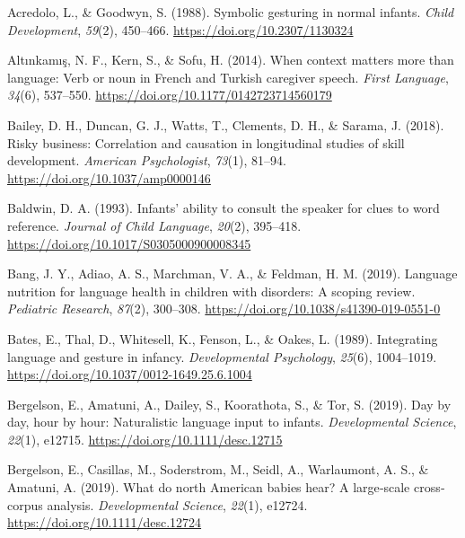 \documentclass[
  man,mask,floatsintext]{apa6}
\newlength{\cslhangindent}
\newlength{\cslentryspacingunit} %
\newenvironment{CSLReferences}[2] %
 {%
  \setlength{\parindent}{0pt}
  \ifodd #1
  \let\oldpar\par
  \def\par{\hangindent=\cslhangindent\oldpar}
  \fi
  \setlength{\parskip}{#2\cslentryspacingunit}
 }%
 {}
\begin{document}
\hypertarget{refs}{}
\begin{CSLReferences}{1}{0}
\leavevmode{}%
Acredolo, L., \& Goodwyn, S. (1988). Symbolic gesturing in normal infants. \emph{Child Development}, \emph{59}(2), 450--466. \url{https://doi.org/10.2307/1130324}

\leavevmode{}%
Altınkamış, N. F., Kern, S., \& Sofu, H. (2014). When context matters more than language: {Verb} or noun in {French} and {Turkish} caregiver speech. \emph{First Language}, \emph{34}(6), 537--550. \url{https://doi.org/10.1177/0142723714560179}

\leavevmode{}%
Bailey, D. H., Duncan, G. J., Watts, T., Clements, D. H., \& Sarama, J. (2018). Risky business: {Correlation} and causation in longitudinal studies of skill development. \emph{American Psychologist}, \emph{73}(1), 81--94. \url{https://doi.org/10.1037/amp0000146}

\leavevmode{}%
Baldwin, D. A. (1993). Infants' ability to consult the speaker for clues to word reference. \emph{Journal of Child Language}, \emph{20}(2), 395--418. \url{https://doi.org/10.1017/S0305000900008345}

\leavevmode{}%
Bang, J. Y., Adiao, A. S., Marchman, V. A., \& Feldman, H. M. (2019). Language nutrition for language health in children with disorders: {A} scoping review. \emph{Pediatric Research}, \emph{87}(2), 300--308. \url{https://doi.org/10.1038/s41390-019-0551-0}

\leavevmode{}%
Bates, E., Thal, D., Whitesell, K., Fenson, L., \& Oakes, L. (1989). Integrating language and gesture in infancy. \emph{Developmental Psychology}, \emph{25}(6), 1004--1019. \url{https://doi.org/10.1037/0012-1649.25.6.1004}

\leavevmode{}%
Bergelson, E., Amatuni, A., Dailey, S., Koorathota, S., \& Tor, S. (2019). Day by day, hour by hour: {Naturalistic} language input to infants. \emph{Developmental Science}, \emph{22}(1), e12715. \url{https://doi.org/10.1111/desc.12715}

\leavevmode{}%
Bergelson, E., Casillas, M., Soderstrom, M., Seidl, A., Warlaumont, A. S., \& Amatuni, A. (2019). What do north {American} babies hear? {A} large‐scale cross‐corpus analysis. \emph{Developmental Science}, \emph{22}(1), e12724. \url{https://doi.org/10.1111/desc.12724}


\end{CSLReferences}
\end{document}
